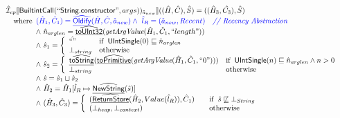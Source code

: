 \[\begin{array}{l}
\aI _{cp}\lbr \SF{BuiltintCall}(``\SF{String.constructor}",args))_{\hat{a}_{new}}\rbr((\hat{H},\hat{C}), \hat{S})
  = ((\hat{H}_3, \hat{C_3}), \hat{S})\\
\quad\wherec{
   \inblue (\hat{H}_1, \hat{C}_1) = \ahf{Oldify}(\hat{H}, \hat{C}, \hat{a}_{new})
   \land\ \inblue\hat{l}_{R} = (\hat{a}_{new}, Recent)
     \quad\comment{{\inblue // Recency Abstraction}}\\
  \land\ \hat{n}_{arglen} = \ahf{toUInt32}(\hf{getArgValue}(\hat{H}_1, \hat{C}_1, ``length"))\\
  \land\ \hat{s}_1 = \left\{\begin{array}{ll}
       \hat{``"}
       & \ifc{\SF{UIntSingle}(0) \sqsubseteq \hat{n}_{arglen}}\\
     \bot_{string}& \owc
     \end{array}\right.\\
  \land\ \hat{s}_2 = \left\{\begin{array}{ll}
       \ahf{toString}(\ahf{toPrimitive}(\hf{getArgValue}(\hat{H}_1, \hat{C}_1, ``0")))
       & \ifc{\SF{UIntSingle}(n) \sqsubseteq \hat{n}_{arglen} \land n > 0}\\
     \bot_{string}& \owc
     \end{array}\right.\\
  \land\ \hat{s} = \hat{s}_1 \sqcup \hat{s}_2\\
  \land\ \hat{H}_2 = \hat{H}_1[\hat{l}_R \mapsto \ahf{NewString}(\hat{s})]\\
  \land\ (\hat{H}_3, \hat{C}_3) = 
    \left\{\begin{array}{l@{\quad\quad}l}
      (\ahf{ReturnStore}(\hat{H}_2, Value(\hat{l}_R)), \hat{C}_1)
      & \ifc{\hat{s} \not\sqsubseteq \bot_{String}}\\
      (\bot_{heap}, \bot_{context}) & \owc \\
    \end{array}\right.\\
  }\\
\\\\



\end{array}\]
